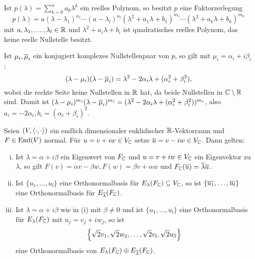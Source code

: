 \begin{korollar}
	\label{lemma:7.11}
	Ist $p(\lambda) = \sum_{k=0}^{n} a_k \lambda^k$ ein reelles Polynom, so besitzt $p$ eine Faktorzerlegung
	\[
		p(\lambda) = a(\lambda-\lambda_1)^{n_1} \cdots (a-\lambda_l)^{n_l} (\lambda^2 + a_1 \lambda + b_1)^{m_1} \cdots (\lambda^2 + a_k \lambda + b_k)^{m_k}
	\]
	mit $a,\lambda_1,\dots,\lambda_l \in \mathbb{R}$ und $\lambda^2 + a_i \lambda + b_i$ ist quadratisches reelles Polynom, das keine reelle Nullstelle besitzt.
\end{korollar}

\begin{beweis}
	Ist $\mu_i, \overline{\mu}_i$ ein konjugiert komplexes Nullstellenpaar von $p$, so gilt mit $\mu_i = \alpha_i + i \beta_i$:
	\[
		(\lambda - \mu_i)(\lambda - \overline{\mu}_i) = \lambda^2 - 2 \alpha_i \lambda + (\alpha_i^2 + \beta_i^2),
	\]
	wobei die rechte Seite keine Nullstellen in $\mathbb{R}$ hat, da beide Nullstellen in $\mathbb{C} \setminus \mathbb{R}$ sind.
	Damit ist $(\lambda - \mu_i)^{m_i} (\lambda - \overline{\mu}_i)^{m_i} = (\lambda^2 - 2 \alpha_i \lambda + (\alpha_i^2 + \beta_i^2))^{m_i}$, also $a_i = -2\alpha_i, b_i = (\alpha_i + \beta_i)^2$. \qedhere
\end{beweis}

\begin{lemma}
	\label{lemma:7.12}
	Seien $(V,\left\langle\cdot,\cdot\right\rangle)$ ein endlich dimensionaler euklidischer $\mathbb{R}$-Vektorraum und $F \in \operatorname{End}(V)$ normal.
	Für $u = v + iw \in V_{\mathbb{C}}$ setze $\overline{u} = v - iw \in V_{\mathbb{C}}$.
	Dann gelten:
	\begin{enumerate}[(i)]
		\item Ist $\lambda = \alpha + i \beta$ ein Eigenwert von $F_{\mathbb{C}}$ und $u = v+iw \in V_{\mathbb{C}}$ ein Eigenvektor zu $\lambda$, so gilt $F(v) = \alpha v - \beta w, F(w) = \beta v + \alpha w$ und $F_{\mathbb{C}}(\overline{u}) = \overline{\lambda} \overline{u}$.
		\item Ist $\{u_1,\dots,u_l\}$ eine Orthonormalbasis für $E_\lambda(F_{\mathbb{C}}) \subseteq V_{\mathbb{C}}$, so ist $\{\overline{u_1},\dots,\overline{u_l}\}$ eine Orthonormalbasis für $E_{\overline{\lambda}}(F_{\mathbb{C}})$.
		\item Ist $\lambda = \alpha + i\beta$ wie in (i) mit $\beta \neq 0$ und ist $\{u_1,\dots,u_l\}$ eine Orthonormalbasis für $E_\lambda(F_{\mathbb{C}})$ mit $u_j = v_j + iw_j$, so ist
		\[
			\left\{\sqrt{2} v_1, \sqrt{2} w_2, \dots, \sqrt{2} v_l,\sqrt{2} w_l\right\}
		\]
		eine Orthonormalbasis von $E_{\lambda}(F_{\mathbb{C}}) \oplus E_{\overline{\lambda}}(F_{\mathbb{C}})$.
	\end{enumerate}
\end{lemma}

